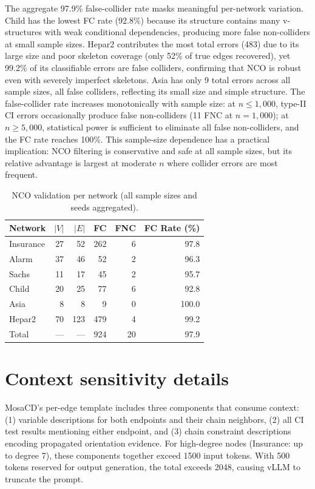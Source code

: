 \documentclass{article}
\begin{document}
The aggregate 97.9\% false-collider rate masks meaningful per-network variation. Child has the lowest FC rate (92.8\%) because its structure contains many v-structures with weak conditional dependencies, producing more false non-colliders at small sample sizes. Hepar2 contributes the most total errors (483) due to its large size and poor skeleton coverage (only 52\% of true edges recovered), yet 99.2\% of its classifiable errors are false colliders, confirming that NCO is robust even with severely imperfect skeletons. Asia has only 9 total errors across all sample sizes, all false colliders, reflecting its small size and simple structure. The false-collider rate increases monotonically with sample size: at $n \leq 1{,}000$, type-II CI errors occasionally produce false non-colliders (11 FNC at $n{=}1{,}000$); at $n \geq 5{,}000$, statistical power is sufficient to eliminate all false non-colliders, and the FC rate reaches 100\%. This sample-size dependence has a practical implication: NCO filtering is conservative and safe at all sample sizes, but its relative advantage is largest at moderate $n$ where collider errors are most frequent.

\begin{table}[h]
\centering
\caption{NCO validation per network (all sample sizes and seeds aggregated).}
\small
\begin{tabular}{lrrrrr}
\toprule
Network & $|V|$ & $|E|$ & FC & FNC & FC Rate (\%) \\
\midrule
Insurance & 27 & 52 & 262 & 6 & 97.8 \\
Alarm     & 37 & 46 & 52  & 2 & 96.3 \\
Sachs     & 11 & 17 & 45  & 2 & 95.7 \\
Child     & 20 & 25 & 77  & 6 & 92.8 \\
Asia      & 8  & 8  & 9   & 0 & 100.0 \\
Hepar2    & 70 & 123 & 479 & 4 & 99.2 \\
\midrule
Total     & ---& --- & 924 & 20 & 97.9 \\
\bottomrule
\end{tabular}
\end{table}

\section{Context sensitivity details}
\label{app:context}

MosaCD's per-edge template includes three components that consume context: (1) variable descriptions for both endpoints and their chain neighbors, (2) all CI test results mentioning either endpoint, and (3) chain constraint descriptions encoding propagated orientation evidence. For high-degree nodes (Insurance: up to degree 7), these components together exceed 1500 input tokens. With 500 tokens reserved for output generation, the total exceeds 2048, causing vLLM to truncate the prompt.
\end{document}
